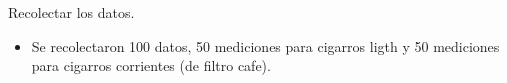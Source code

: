 Recolectar los datos.

\begin{itemize}
	\item Se recolectaron 100 datos, 50 mediciones para cigarros ligth y 50 mediciones para cigarros corrientes (de filtro cafe). 
\end{itemize}

